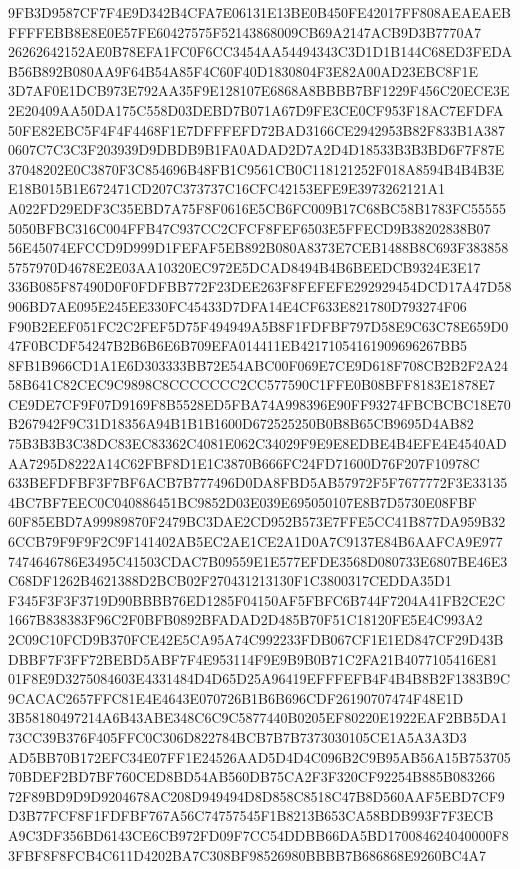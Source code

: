 \documentclass[UTF8,fontset=fandol,zihao=-4,a4paper]{ctexart}
\begin{document}
{{9FB3D9587CF7F4E9D342B4CFA7E06131E13BE0B450FE42017FF808AEAEAEBFFFFEBB8E8E0E57FE60427575F52143868009CB69A2147ACB9D3B7770A7
26262642152AE0B78EFA1FC0F6CC3454AA54494343C3D1D1B144C68ED3FEDAB56B892B080AA9F64B54A85F4C60F40D1830804F3E82A00AD23EBC8F1E
3D7AF0E1DCB973E792AA35F9E128107E6868A8BBBB7BF1229F456C20ECE3E2E20409AA50DA175C558D03DEBD7B071A67D9FE3CE0CF953F18AC7EFDFA
50FE82EBC5F4F4F4468F1E7DFFFEFD72BAD3166CE2942953B82F833B1A3870607C7C3C3F203939D9DBDB9B1FA0ADAD2D7A2D4D18533B3B3BD6F7F87E
37048202E0C3870F3C854696B48FB1C9561CB0C118121252F018A8594B4B4B3EE18B015B1E672471CD207C373737C16CFC42153EFE9E3973262121A1
A022FD29EDF3C35EBD7A75F8F0616E5CB6FC009B17C68BC58B1783FC555555050BFBC316C004FFB47C937CC2CFCF8FEF6503E5FFECD9B38202838B07
56E45074EFCCD9D999D1FEFAF5EB892B080A8373E7CEB1488B8C693F3838585757970D4678E2E03AA10320EC972E5DCAD8494B4B6BEEDCB9324E3E17
336B085F87490D0F0FDFBB772F23DEE263F8FEFEFE292929454DCD17A47D58906BD7AE095E245EE330FC45433D7DFA14E4CF633E821780D793274F06
F90B2EEF051FC2C2FEF5D75F494949A5B8F1FDFBF797D58E9C63C78E659D047F0BCDF54247B2B6B6E6B709EFA014411EB42171054161909696267BB5
8FB1B966CD1A1E6D303333BB72E54ABC00F069E7CE9D618F708CB2B2F2A2458B641C82CEC9C9898C8CCCCCCC2CC577590C1FFE0B08BFF8183E1878E7
CE9DE7CF9F07D9169F8B5528ED5FBA74A998396E90FF93274FBCBCBC18E70B267942F9C31D18356A94B1B1B1600D672525250B0B8B65CB9695D4AB82
75B3B3B3C38DC83EC83362C4081E062C34029F9E9E8EDBE4B4EFE4E4540ADAA7295D8222A14C62FBF8D1E1C3870B666FC24FD71600D76F207F10978C
633BEFDFBF3F7BF6ACB7B777496D0DA8FBD5AB57972F5F7677772F3E331354BC7BF7EEC0C040886451BC9852D03E039E695050107E8B7D5730E08FBF
60F85EBD7A99989870F2479BC3DAE2CD952B573E7FFE5CC41B877DA959B326CCB79F9F9F2C9F141402AB5EC2AE1CE2A1D0A7C9137E84B6AAFCA9E977
7474646786E3495C41503CDAC7B09559E1E577EFDE3568D080733E6807BE46E3C68DF1262B4621388D2BCB02F270431213130F1C3800317CEDDA35D1
F345F3F3F3719D90BBBB76ED1285F04150AF5FBFC6B744F7204A41FB2CE2C1667B838383F96C2F0BFB0892BFADAD2D485B70F51C18120FE5E4C993A2
2C09C10FCD9B370FCE42E5CA95A74C992233FDB067CF1E1ED847CF29D43BDBBF7F3FF72BEBD5ABF7F4E953114F9E9B9B0B71C2FA21B4077105416E81
01F8E9D3275084603E4331484D4D65D25A96419EFFFEFB4F4B4B8B2F1383B9C9CACAC2657FFC81E4E4643E070726B1B6B696CDF26190707474F48E1D
3B58180497214A6B43ABE348C6C9C5877440B0205EF80220E1922EAF2BB5DA173CC39B376F405FFC0C306D822784BCB7B7B7373030105CE1A5A3A3D3
AD5BB70B172EFC34E07FF1E24526AAD5D4D4C096B2C9B95AB56A15B75370570BDEF2BD7BF760CED8BD54AB560DB75CA2F3F320CF92254B885B083266
72F89BD9D9D9204678AC208D949494D8D858C8518C47B8D560AAF5EBD7CF9D3B77FCF8F1FDFBF767A56C74757545F1B8213B653CA58BDB993F7F3ECB
A9C3DF356BD6143CE6CB972FD09F7CC54DDBB66DA5BD170084624040000F83FBF8F8FCB4C611D4202BA7C308BF98526980BBBB7B686868E9260BC4A7
}}
\end{document}
